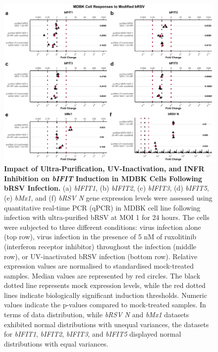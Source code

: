 \begin{figure}
    \centering
    \includegraphics[width=1\linewidth]{07. Chapter 2/Figs/02. Induction/04. mdbk_brsv_uv_roxo.pdf}
    \caption[Impact of Ultra-Purification, UV-Inactivation, and INFR Inhibition on \textit{bIFIT} Induction in MDBK Cells Following bRSV Infection.]{\textbf{Impact of Ultra-Purification, UV-Inactivation, and INFR Inhibition on \textit{bIFIT} Induction in MDBK Cells Following bRSV Infection.} (a) \textit{bIFIT1}, (b) \textit{bIFIT2}, (c) \textit{bIFIT3}, (d) \textit{bIFIT5}, (e) \textit{bMx1}, and (f) \textit{bRSV N} gene expression levels were assessed using quantitative real-time PCR (qPCR) in MDBK cell line following infection with ultra-purified bRSV at MOI 1 for 24 hours. The cells were subjected to three different conditions: virus infection alone (top row), virus infection in the presence of 5 nM of ruxolitinib (interferon receptor inhibitor) throughout the infection (middle row), or UV-inactivated bRSV infection (bottom row). Relative expression values are normalised to standardised mock-treated samples. Median values are represented by red circles. The black dotted line represents mock expression levels, while the red dotted lines indicate biologically significant induction thresholds. Numeric values indicate the p-values compared to mock-treated samples. In terms of data distribution, while \textit{bRSV N} and \textit{bMx1} datasets exhibited normal distributions with unequal variances, the datasets for \textit{bIFIT1}, \textit{bIFIT2}, \textit{bIFIT3}, and \textit{bIFIT5} displayed normal distributions with equal variances.}
    \label{fig:The effect of ultra-purification, UV-inactivation and INFR inhibition on hIFIT induction following hRSV infection in MDBK}
\end{figure}

